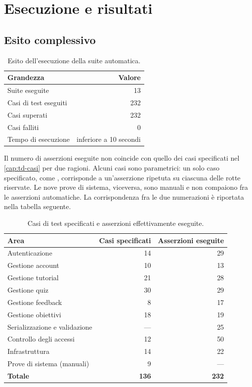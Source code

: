 \chapter{Esecuzione e risultati}
\label{cap:td-esecuzione}

\section{Esito complessivo}

\begin{table}[H]
\centering
\begin{tabular}{@{}L{7.6cm} r@{}}
\toprule
\textbf{Grandezza} & \textbf{Valore} \\
\midrule
Suite eseguite            & 13 \\
Casi di test eseguiti     & 232 \\
Casi superati             & 232 \\
Casi falliti              & 0 \\
Tempo di esecuzione       & inferiore a 10 secondi \\
\bottomrule
\end{tabular}
\caption{Esito dell'esecuzione della suite automatica.}
\label{tab:td-esito}
\end{table}

Il numero di asserzioni eseguite non coincide con quello dei casi specificati
nel \cref{cap:td-casi} per due ragioni. Alcuni casi sono parametrici: un solo
caso specificato, come , corrisponde a un'asserzione ripetuta
su ciascuna delle rotte riservate. Le nove prove di sistema, viceversa, sono
manuali e non compaiono fra le asserzioni automatiche. La corrispondenza fra
le due numerazioni è riportata nella tabella seguente.

\begin{table}[H]
\centering
\begin{tabular}{@{}L{6.2cm} r r@{}}
\toprule
\textbf{Area} & \textbf{Casi specificati} & \textbf{Asserzioni eseguite} \\
\midrule
Autenticazione                & 14 & 29 \\
Gestione account              & 10 & 13 \\
Gestione tutorial             & 21 & 28 \\
Gestione quiz                 & 30 & 29 \\
Gestione feedback             &  8 & 17 \\
Gestione obiettivi            & 18 & 19 \\
Serializzazione e validazione &  — & 25 \\
Controllo degli accessi       & 12 & 50 \\
Infrastruttura                & 14 & 22 \\
Prove di sistema (manuali)    &  9 & — \\
\midrule
\textbf{Totale}               & \textbf{136} & \textbf{232} \\
\bottomrule
\end{tabular}
\caption{Casi di test specificati e asserzioni effettivamente eseguite.}
\label{tab:td-conteggi}
\end{table}

